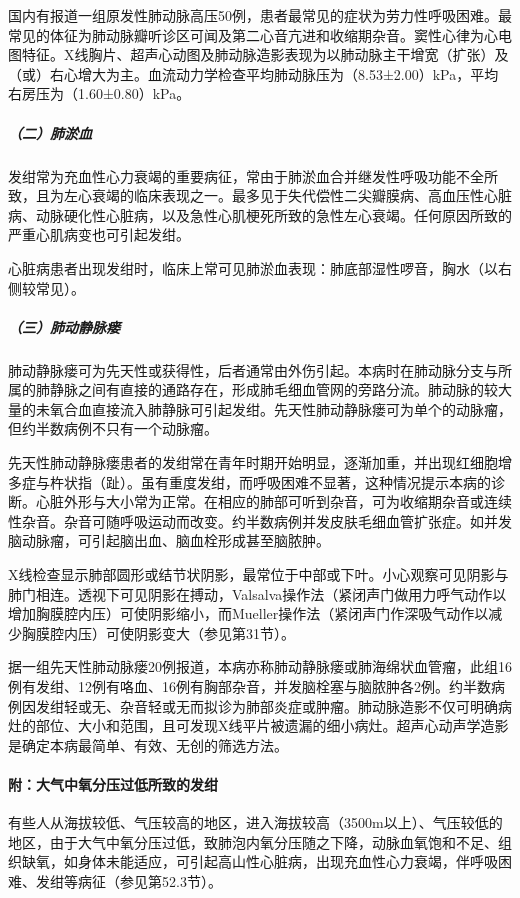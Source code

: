 国内有报道一组原发性肺动脉高压50例，患者最常见的症状为劳力性呼吸困难。最常见的体征为肺动脉瓣听诊区可闻及第二心音亢进和收缩期杂音。窦性心律为心电图特征。X线胸片、超声心动图及肺动脉造影表现为以肺动脉主干增宽（扩张）及（或）右心增大为主。血流动力学检查平均肺动脉压为（8.53±2.00）kPa，平均右房压为（1.60±0.80）kPa。

\subparagraph{（二）肺淤血}

发绀常为充血性心力衰竭的重要病征，常由于肺淤血合并继发性呼吸功能不全所致，且为左心衰竭的临床表现之一。最多见于失代偿性二尖瓣膜病、高血压性心脏病、动脉硬化性心脏病，以及急性心肌梗死所致的急性左心衰竭。任何原因所致的严重心肌病变也可引起发绀。

心脏病患者出现发绀时，临床上常可见肺淤血表现：肺底部湿性啰音，胸水（以右侧较常见）。

\subparagraph{（三）肺动静脉瘘}

肺动静脉瘘可为先天性或获得性，后者通常由外伤引起。本病时在肺动脉分支与所属的肺静脉之间有直接的通路存在，形成肺毛细血管网的旁路分流。肺动脉的较大量的未氧合血直接流入肺静脉可引起发绀。先天性肺动静脉瘘可为单个的动脉瘤，但约半数病例不只有一个动脉瘤。

先天性肺动静脉瘘患者的发绀常在青年时期开始明显，逐渐加重，并出现红细胞增多症与杵状指（趾）。虽有重度发绀，而呼吸困难不显著，这种情况提示本病的诊断。心脏外形与大小常为正常。在相应的肺部可听到杂音，可为收缩期杂音或连续性杂音。杂音可随呼吸运动而改变。约半数病例并发皮肤毛细血管扩张症。如并发脑动脉瘤，可引起脑出血、脑血栓形成甚至脑脓肿。

X线检查显示肺部圆形或结节状阴影，最常位于中部或下叶。小心观察可见阴影与肺门相连。透视下可见阴影在搏动，Valsalva操作法（紧闭声门做用力呼气动作以增加胸膜腔内压）可使阴影缩小，而Mueller操作法（紧闭声门作深吸气动作以减少胸膜腔内压）可使阴影变大（参见第31节）。

据一组先天性肺动脉瘘20例报道，本病亦称肺动静脉瘘或肺海绵状血管瘤，此组16例有发绀、12例有咯血、16例有胸部杂音，并发脑栓塞与脑脓肿各2例。约半数病例因发绀轻或无、杂音轻或无而拟诊为肺部炎症或肿瘤。肺动脉造影不仅可明确病灶的部位、大小和范围，且可发现X线平片被遗漏的细小病灶。超声心动声学造影是确定本病最简单、有效、无创的筛选方法。

\paragraph{附：大气中氧分压过低所致的发绀}

有些人从海拔较低、气压较高的地区，进入海拔较高（3500m以上）、气压较低的地区，由于大气中氧分压过低，致肺泡内氧分压随之下降，动脉血氧饱和不足、组织缺氧，如身体未能适应，可引起高山性心脏病，出现充血性心力衰竭，伴呼吸困难、发绀等病征（参见第52.3节）。

